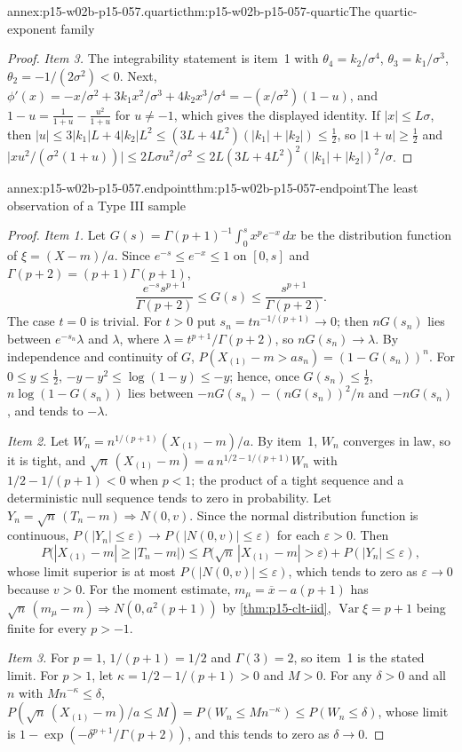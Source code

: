 \begin{annexitem}{annex:p15-w02b-p15-057.quartic}{thm:p15-w02b-p15-057-quartic}{The quartic-exponent family}
\begin{proof}
\emph{Item 3.} The integrability statement is item~1 with
\(\theta_4=k_2/\sigma^4\), \(\theta_3=k_1/\sigma^3\),
\(\theta_2=-1/(2\sigma^2)<0\). Next,
\(\phi'(x)=-x/\sigma^2+3k_1x^2/\sigma^3+4k_2x^3/\sigma^4
=-(x/\sigma^2)(1-u)\), and \(1-u=\frac1{1+u}-\frac{u^2}{1+u}\) for
\(u\neq-1\), which gives the displayed identity. If \(|x|\leq L\sigma\),
then \(|u|\leq3|k_1|L+4|k_2|L^2\leq(3L+4L^2)(|k_1|+|k_2|)\leq\frac12\), so
\(|1+u|\geq\frac12\) and
\(\bigl|xu^2/(\sigma^2(1+u))\bigr|\leq2L\sigma u^2/\sigma^2
\leq2L(3L+4L^2)^2(|k_1|+|k_2|)^2/\sigma\).
\end{proof}
\end{annexitem}

\begin{annexitem}{annex:p15-w02b-p15-057.endpoint}{thm:p15-w02b-p15-057-endpoint}{The least observation of a Type III sample}
\begin{proof}
\emph{Item 1.} Let \(G(s)=\Gamma(p+1)^{-1}\int_0^sx^pe^{-x}\,dx\) be the
distribution function of \(\xi=(X-m)/a\). Since \(e^{-s}\leq e^{-x}\leq1\)
on \([0,s]\) and \(\Gamma(p+2)=(p+1)\Gamma(p+1)\),
\[
 \frac{e^{-s}s^{p+1}}{\Gamma(p+2)}\leq G(s)\leq\frac{s^{p+1}}{\Gamma(p+2)} .
\]
The case \(t=0\) is trivial. For \(t>0\) put
\(s_n=tn^{-1/(p+1)}\to0\); then \(nG(s_n)\) lies between
\(e^{-s_n}\lambda\) and \(\lambda\), where
\(\lambda=t^{p+1}/\Gamma(p+2)\), so \(nG(s_n)\to\lambda\). By independence
and continuity of \(G\),
\(P(X_{(1)}-m>as_n)=(1-G(s_n))^n\). For \(0\leq y\leq\frac12\),
\(-y-y^2\leq\log(1-y)\leq-y\); hence, once \(G(s_n)\leq\frac12\),
\(n\log(1-G(s_n))\) lies between \(-nG(s_n)-(nG(s_n))^2/n\) and
\(-nG(s_n)\), and tends to \(-\lambda\).

\emph{Item 2.} Let \(W_n=n^{1/(p+1)}(X_{(1)}-m)/a\). By item~1, \(W_n\)
converges in law, so it is tight, and
\(\sqrt n\,(X_{(1)}-m)=a\,n^{1/2-1/(p+1)}W_n\) with
\(1/2-1/(p+1)<0\) when \(p<1\); the product of a tight sequence and a
deterministic null sequence tends to zero in probability. Let
\(Y_n=\sqrt n\,(T_n-m)\Rightarrow N(0,v)\). Since the normal distribution
function is continuous, \(P(|Y_n|\leq\varepsilon)\to
P(|N(0,v)|\leq\varepsilon)\) for each \(\varepsilon>0\). Then
\[
 P\bigl(|X_{(1)}-m|\geq|T_n-m|\bigr)
 \leq P\bigl(\sqrt n\,|X_{(1)}-m|>\varepsilon\bigr)
 +P(|Y_n|\leq\varepsilon),
\]
whose limit superior is at most \(P(|N(0,v)|\leq\varepsilon)\), which
tends to zero as \(\varepsilon\to0\) because \(v>0\). For the moment
estimate, \(m_\mu=\overline x-a(p+1)\) has
\(\sqrt n\,(m_\mu-m)\Rightarrow N(0,a^2(p+1))\) by \cref{thm:p15-clt-iid},
\(\operatorname{Var}\xi=p+1\) being finite for every \(p>-1\).

\emph{Item 3.} For \(p=1\), \(1/(p+1)=1/2\) and \(\Gamma(3)=2\), so item~1
is the stated limit. For \(p>1\), let \(\kappa=1/2-1/(p+1)>0\) and
\(M>0\). For any \(\delta>0\) and all \(n\) with \(Mn^{-\kappa}\leq\delta\),
\(P(\sqrt n\,(X_{(1)}-m)/a\leq M)=P(W_n\leq Mn^{-\kappa})\leq
P(W_n\leq\delta)\), whose limit is
\(1-\exp(-\delta^{p+1}/\Gamma(p+2))\), and this tends to zero as
\(\delta\to0\).
\end{proof}
\end{annexitem}

